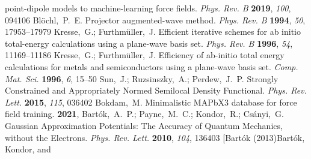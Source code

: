 \documentclass[journal=jpccck,manuscript=article,layout=twocolumn]{achemso}
\begin{document}
\begin{mcitethebibliography}{62}
  point-dipole models to machine-learning force fields. \emph{Phys. Rev. B}
  \textbf{2019}, \emph{100}, 094106\relax
\mciteBstWouldAddEndPuncttrue
\mciteSetBstMidEndSepPunct{\mcitedefaultmidpunct}
{\mcitedefaultendpunct}{\mcitedefaultseppunct}\relax
\EndOfBibitem
{}
Bl{\"{o}}chl,~P.~E. Projector augmented-wave method. \emph{Phys. Rev. B}
  \textbf{1994}, \emph{50}, 17953--17979\relax
\mciteBstWouldAddEndPuncttrue
\mciteSetBstMidEndSepPunct{\mcitedefaultmidpunct}
{\mcitedefaultendpunct}{\mcitedefaultseppunct}\relax
\EndOfBibitem
{}
Kresse,~G.; Furthm{\"{u}}ller,~J. Efficient iterative schemes for ab initio
  total-energy calculations using a plane-wave basis set. \emph{Phys. Rev. B}
  \textbf{1996}, \emph{54}, 11169--11186\relax
\mciteBstWouldAddEndPuncttrue
\mciteSetBstMidEndSepPunct{\mcitedefaultmidpunct}
{\mcitedefaultendpunct}{\mcitedefaultseppunct}\relax
\EndOfBibitem
{}
Kresse,~G.; Furthm{\"{u}}ller,~J. Efficiency of ab-initio total energy
  calculations for metals and semiconductors using a plane-wave basis set.
  \emph{Comp. Mat. Sci.} \textbf{1996}, \emph{6}, 15--50\relax
\mciteBstWouldAddEndPuncttrue
\mciteSetBstMidEndSepPunct{\mcitedefaultmidpunct}
{\mcitedefaultendpunct}{\mcitedefaultseppunct}\relax
\EndOfBibitem
{}
Sun,~J.; Ruzsinszky,~A.; Perdew,~J.~P. Strongly Constrained and Appropriately
  Normed Semilocal Density Functional. \emph{Phys. Rev. Lett.} \textbf{2015},
  \emph{115}, 036402\relax
\mciteBstWouldAddEndPuncttrue
\mciteSetBstMidEndSepPunct{\mcitedefaultmidpunct}
{\mcitedefaultendpunct}{\mcitedefaultseppunct}\relax
\EndOfBibitem
{}
Bokdam,~M. Minimalistic MAPbX3 database for force field training.
  \textbf{2021}, \relax
\mciteBstWouldAddEndPunctfalse
\mciteSetBstMidEndSepPunct{\mcitedefaultmidpunct}
{}{\mcitedefaultseppunct}\relax
\EndOfBibitem
{}
Bart\'ok,~A.~P.; Payne,~M.~C.; Kondor,~R.; Cs\'anyi,~G. Gaussian Approximation
  Potentials: The Accuracy of Quantum Mechanics, without the Electrons.
  \emph{Phys. Rev. Lett.} \textbf{2010}, \emph{104}, 136403\relax
\mciteBstWouldAddEndPuncttrue
\mciteSetBstMidEndSepPunct{\mcitedefaultmidpunct}
{\mcitedefaultendpunct}{\mcitedefaultseppunct}\relax
\EndOfBibitem
\bibitem[Bart\'ok (2013)Bart\'ok, Kondor, and

\end{mcitethebibliography}
\end{document}
